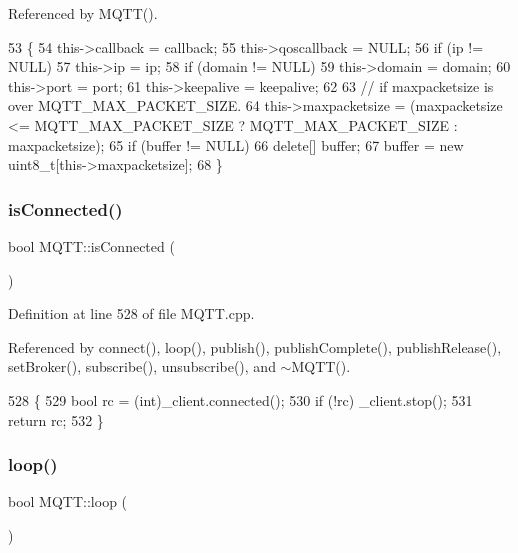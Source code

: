 Referenced by M\+Q\+T\+T().


\begin{DoxyCode}
53                                                                                                            
                                          \{
54     this->callback = callback;
55     this->qoscallback = NULL;
56     \textcolor{keywordflow}{if} (ip != NULL)
57         this->ip = ip;
58     \textcolor{keywordflow}{if} (domain != NULL)
59         this->domain = domain;
60     this->port = port;
61     this->keepalive = keepalive;
62 
63     \textcolor{comment}{// if maxpacketsize is over MQTT\_MAX\_PACKET\_SIZE.}
64     this->maxpacketsize = (maxpacketsize <= MQTT_MAX_PACKET_SIZE ? 
      MQTT_MAX_PACKET_SIZE : maxpacketsize);
65     \textcolor{keywordflow}{if} (buffer != NULL)
66       \textcolor{keyword}{delete}[] buffer;
67     buffer = \textcolor{keyword}{new} uint8\_t[this->maxpacketsize];
68 \}
\end{DoxyCode}
\mbox{\label{class_m_q_t_t_a57a5231fd3205682c56de70e57dd9d62}} 
\subsubsection{is\+Connected()}
{\footnotesize\ttfamily bool M\+Q\+T\+T\+::is\+Connected (\begin{DoxyParamCaption}{ }\end{DoxyParamCaption})}



Definition at line 528 of file M\+Q\+T\+T.\+cpp.



Referenced by connect(), loop(), publish(), publish\+Complete(), publish\+Release(), set\+Broker(), subscribe(), unsubscribe(), and $\sim$\+M\+Q\+T\+T().


\begin{DoxyCode}
528                        \{
529     \textcolor{keywordtype}{bool} rc = (int)_client.connected();
530     \textcolor{keywordflow}{if} (!rc) _client.stop();
531     \textcolor{keywordflow}{return} rc;
532 \}
\end{DoxyCode}
\mbox{\label{class_m_q_t_t_a5f9624e440c99d7ec0fb0a8c1a30d064}} 
\subsubsection{loop()}
{\footnotesize\ttfamily bool M\+Q\+T\+T\+::loop (\begin{DoxyParamCaption}{ }\end{DoxyParamCaption})}



